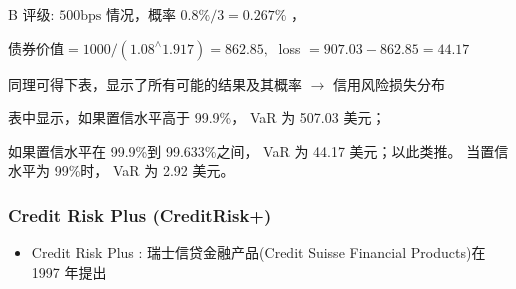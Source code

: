 \begin{itemize}
 B 评级: \({500}\mathrm{{bps}}\) 情况，概率 \({0.8}\% /3 = {0.267}\%\) ，
 
 债券价值\(= {1000}/\left( {{1.08}^{ \land  }{1.917}}\right)  = {862.85},\;\) loss \(= {907.03} - {862.85} = {44.17}\)

 同理可得下表，显示了所有可能的结果及其概率 \(\rightarrow\) 信用风险损失分布

\begin{center}
\end{center}

表中显示，如果置信水平高于 99.9\%， VaR 为 507.03 美元；

 如果置信水平在 99.9\%到 99.633\%之间， VaR 为 44.17 美元；以此类推。 当置信水平为 99\%时， VaR 为 2.92 美元。

\end{itemize}

\subsubsection{Credit Risk Plus (CreditRisk+)}

\begin{itemize}
\item Credit Risk Plus : 瑞士信贷金融产品(Credit Suisse Financial Products)在 1997 年提出
\end{itemize}

